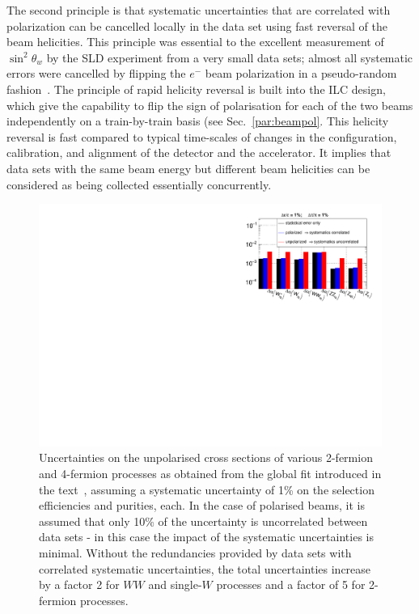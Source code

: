The second principle is that systematic uncertainties that are correlated with polarization can be cancelled locally in the data set using fast reversal of the beam helicities.  This principle 
was essential to the excellent measurement of $\sin^2\theta_w$ by the SLD experiment 
from a very small data sets; almost all systematic errors were cancelled by flipping the $e^-$ beam  polarization in a pseudo-random fashion~\cite{Abe:1996nj}.   The principle of rapid helicity reversal is built into the ILC design, which give the capability to flip the sign of 
polarisation for each of the two beams independently on a train-by-train basis (see Sec.~\ref{par:beampol}.  This helicity reversal is fast compared to typical time-scales of changes in the configuration, calibration, and alignment of the detector and the accelerator.
It implies that data sets with the same beam energy but different beam helicities can be considered as being collected  essentially concurrently.  

\begin{figure}
\centering
\includegraphics[width=0.95\linewidth]{./chapters/figures/ElectroWeakSysDependency_alpha_short.pdf}
		
\caption{Uncertainties on the unpolarised cross sections of various 2-fermion and 4-fermion processes as obtained from the global fit introduced in the text~\cite{bib:PhDRobert}, assuming a systematic uncertainty of 1\% on the selection efficiencies and purities, each. In the case of polarised beams, it is assumed that only 10\% of the uncertainty is uncorrelated between data sets - in this case the impact of the systematic uncertainties is minimal. Without the redundancies provided by data sets with correlated systematic uncertainties, the total uncertainties increase by a factor 2 for $WW$ and single-$W$ processes and a factor of 5 for 2-fermion processes.}
\label{fig:alpha_error_corr_uncorr}
\end{figure}


